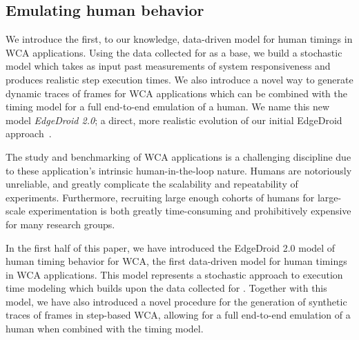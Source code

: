 \subsection{Emulating human behavior}

We introduce the first, to our knowledge, data-driven model for human timings in \ac{WCA} applications.
Using the data collected for \textcite{olguinmunoz:impact2021} as a base, we build a stochastic model which takes as
input past measurements of system responsiveness and produces realistic step execution times.
We also introduce a novel way to generate dynamic traces of frames for \ac{WCA} applications which can be combined
with the timing model for a full end-to-end emulation of a human.
We name this new model \emph{EdgeDroid 2.0}; a direct, more realistic evolution of our initial EdgeDroid
approach~\cite{olguin2018scaling,olguin2019edgedroid}.

The study and benchmarking of \ac{WCA} applications is a challenging discipline due to these application's intrinsic
human-in-the-loop nature.
Humans are notoriously unreliable, and greatly complicate the scalability and repeatability of experiments.
Furthermore, recruiting large enough cohorts of humans for large-scale experimentation is both greatly time-consuming
and prohibitively expensive for many research groups.

In the first half of this paper, we have introduced the EdgeDroid 2.0 model of human timing behavior for \ac{WCA},
the first data-driven model for human timings in \ac{WCA} applications.
This model represents a stochastic approach to execution time modeling which builds upon the data collected for
\textcite{olguinmunoz:impact2021}.
Together with this model, we have also introduced a novel procedure for the generation of synthetic traces of frames in step-based \ac{WCA}, allowing for a full end-to-end emulation of a human when combined with the timing model.

